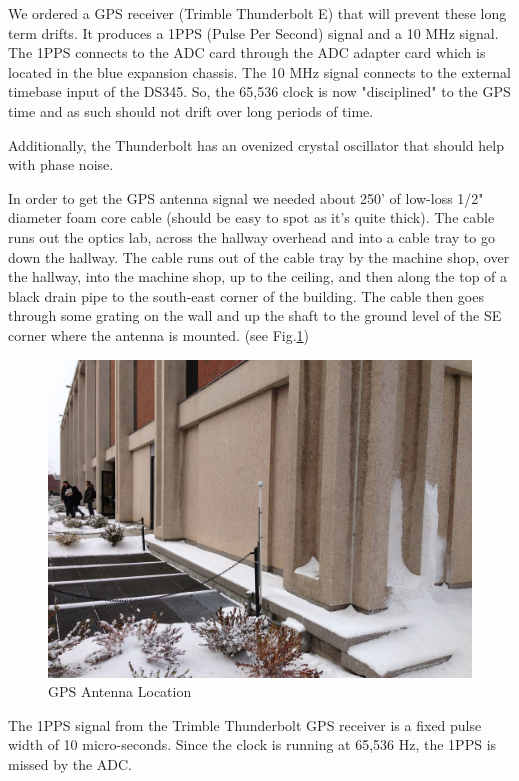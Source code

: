 We ordered a GPS receiver (Trimble Thunderbolt E) that will prevent these long term drifts. It produces a 1PPS (Pulse Per Second) signal and a 10 MHz signal. The 1PPS connects to the ADC card through the ADC adapter card which is located in the blue expansion chassis. The 10 MHz signal connects to the external timebase input of the DS345. So, the 65,536 clock is now "disciplined" to the GPS time and as such should not drift over long periods of time.

Additionally, the Thunderbolt has an ovenized crystal oscillator that should help with phase noise.

In order to get the GPS antenna signal we needed about 250' of low-loss 1/2" diameter foam core cable (should be easy to spot as it's quite thick). The cable runs out the optics lab, across the hallway overhead and into a cable tray to go down the hallway. The cable runs out of the cable tray by the machine shop, over the hallway, into the machine shop, up to the ceiling, and then along the top of a black drain pipe to the south-east corner of the building. The cable then goes through some grating on the wall and up the shaft to the ground level of the SE corner where the antenna is mounted. (see Fig.\ref{fig:gps_antenna})

\begin{figure}[htbp]
	\centering
		\includegraphics[width=15cm]{./figures/IMG_1308.jpg}
	\caption{{GPS Antenna Location}}
	\label{fig:gps_antenna}
\end{figure}

The 1PPS signal from the Trimble Thunderbolt GPS receiver is a fixed pulse width of 10 micro-seconds. Since the clock is running at 65,536 Hz, the 1PPS is missed by the ADC.

